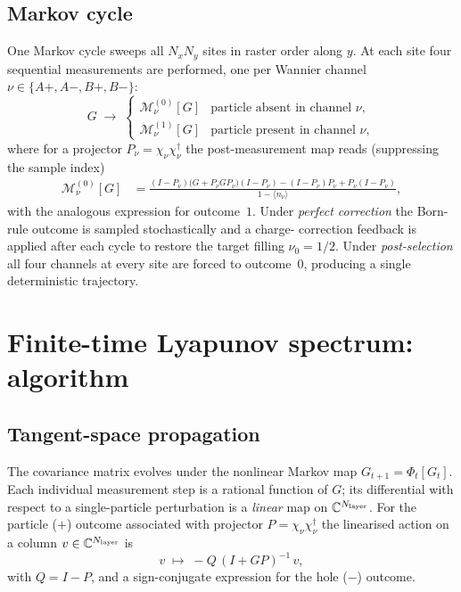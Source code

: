 \documentclass[aps,twocolumn,floatfix,superscriptaddress,nofootinbib]{revtex4-2}
\newcommand{\Nlayer}{N_{\rm layer}}
\begin{document}
\subsection{Markov cycle}
One Markov cycle sweeps all $N_xN_y$ sites in raster order along $y$.  At
each site four sequential measurements are performed, one per Wannier channel
$\nu\in\{A+,A-,B+,B-\}$:
\begin{equation}
  G\;\to\;
  \begin{cases}
    \mathcal{M}_\nu^{(0)}[G] & \text{particle absent in channel }\nu,\\
    \mathcal{M}_\nu^{(1)}[G] & \text{particle present in channel }\nu,
  \end{cases}
\end{equation}
where for a projector $P_\nu=\chi_\nu\chi_\nu^\dagger$ the post-measurement
map reads (suppressing the sample index)
\begin{align}
  \mathcal{M}_\nu^{(0)}[G]
    &=\frac{(I-P_\nu)\bigl(G+P_\nu G P_\nu\bigr)(I-P_\nu)
           -(I-P_\nu)P_\nu + P_\nu(I-P_\nu)}
           {1-\langle n_\nu\rangle},
  \label{eq:meas_map}
\end{align}
with the analogous expression for outcome~$1$.  Under \emph{perfect
correction} the Born-rule outcome is sampled stochastically and a charge-
correction feedback is applied after each cycle to restore the target filling
$\nu_0=1/2$.  Under \emph{post-selection} all four channels at every site are
forced to outcome~$0$, producing a single deterministic trajectory.

\section{Finite-time Lyapunov spectrum: algorithm}
\label{sec:lyapunov}

\subsection{Tangent-space propagation}
\label{sec:tangent}

The covariance matrix evolves under the nonlinear Markov map
$G_{t+1}=\Phi_t[G_t]$.  Each individual measurement step is a rational
function of $G$; its differential with respect to a single-particle
perturbation is a \emph{linear} map on $\mathbb{C}^{\Nlayer}$.  For the
particle ($+$) outcome associated with projector $P=\chi_\nu\chi_\nu^\dagger$
the linearised action on a column $v\in\mathbb{C}^{\Nlayer}$ is
\begin{equation}
  v \;\mapsto\; -Q\,(I+GP)^{-1}\,v,
  \label{eq:lin_map}
\end{equation}
with $Q=I-P$, and a sign-conjugate expression for the hole ($-$) outcome.
\end{document}

